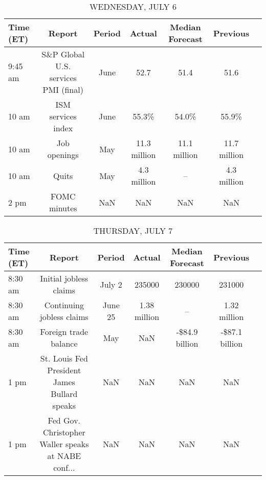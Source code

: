 \documentclass{article}%
\begin{document}
\begin{table}[htbp]%
\caption{WEDNESDAY, JULY 6}%
\centering%
\begin{adjustbox}{width=1\textwidth}%
\begin{tabular}{lcccccc}
\toprule
Time (ET) &                               Report & Period &       Actual & Median Forecast &     Previous \\
\midrule
  9:45 am & S\&P Global U.S. services PMI (final) &   June &         52.7 &            51.4 &         51.6 \\
    10 am &                   ISM services index &   June &        55.3\% &           54.0\% &        55.9\% \\
    10 am &                         Job openings &    May & 11.3 million &    11.1 million & 11.7 million \\
    10 am &                                Quits &    May &  4.3 million &              -- &  4.3 million \\
     2 pm &                         FOMC minutes &    NaN &          NaN &             NaN &          NaN \\
\bottomrule
\end{tabular}
%
\end{adjustbox}%
\end{table}

%


\begin{table}[htbp]%
\caption{THURSDAY, JULY 7}%
\centering%
\begin{adjustbox}{width=1\textwidth}%
\begin{tabular}{lcccccc}
\toprule
Time (ET) &                                             Report &  Period &       Actual & Median Forecast &       Previous \\
\midrule
  8:30 am &                             Initial jobless claims &  July 2 &       235000 &          230000 &         231000 \\
  8:30 am &                          Continuing jobless claims & June 25 & 1.38 million &              -- &   1.32 million \\
  8:30 am &                              Foreign trade balance &     May &          NaN &  -\$84.9 billion & -\$87.1 billion \\
     1 pm &       St. Louis Fed President James Bullard speaks &     NaN &          NaN &             NaN &            NaN \\
     1 pm & Fed Gov. Christopher Waller speaks at NABE conf... &     NaN &          NaN &             NaN &            NaN \\
\bottomrule
\end{tabular}
%
\end{adjustbox}%
\end{table}
\end{document}
